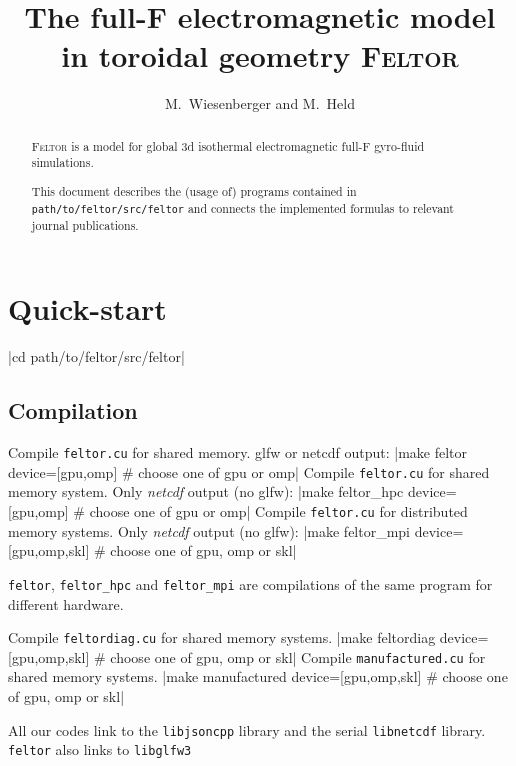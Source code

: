 


\usepackage{minted}



\title{
The full-F electromagnetic model in toroidal geometry \textsc{Feltor}}
\author{ M.~Wiesenberger and M.~Held}
\maketitle

\begin{abstract}
\textsc{Feltor} is a model for global 3d isothermal electromagnetic full-F gyro-fluid simulations.

\noindent
This document describes the (usage of) programs
contained in \texttt{path/to/feltor/src/feltor}
and connects
the implemented formulas to relevant journal publications.
\end{abstract}
\tableofcontents

\section{Quick-start}

|cd path/to/feltor/src/feltor|
\subsection{Compilation}
Compile \texttt{feltor.cu} for shared memory. glfw or netcdf output:
|make feltor device=[gpu,omp] # choose one of gpu or omp|
\noindent Compile \texttt{feltor.cu} for shared memory system. Only {\it netcdf} output (no glfw):
|make feltor_hpc device=[gpu,omp] # choose one of gpu or omp|
\noindent Compile \texttt{feltor.cu} for distributed memory systems. Only {\it netcdf} output (no glfw):
|make feltor_mpi device=[gpu,omp,skl] # choose one of gpu, omp or skl|
\begin{tcolorbox}[title=Note]
    \texttt{feltor}, \texttt{feltor_hpc} and \texttt{feltor_mpi} are
    compilations of the same program for different hardware.
\end{tcolorbox}
\noindent Compile \texttt{feltordiag.cu} for shared memory systems.
|make feltordiag device=[gpu,omp,skl] # choose one of gpu, omp or skl|
\noindent Compile \texttt{manufactured.cu} for shared memory systems.
|make manufactured device=[gpu,omp,skl] # choose one of gpu, omp or skl|
\begin{tcolorbox}[title=Note]
    All our codes link to the \texttt{libjsoncpp} library and the serial \texttt{libnetcdf} library. \texttt{feltor} also links to \texttt{libglfw3}
\end{tcolorbox}
